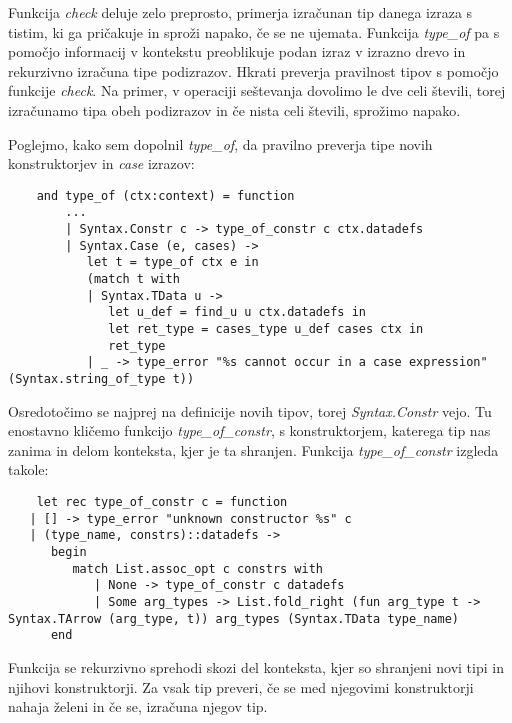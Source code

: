 \documentclass[12pt,a4paper,openany]{book}
\begin{document}
Funkcija \emph{check} deluje zelo preprosto, primerja izračunan tip danega izraza s tistim, ki ga pričakuje in sproži napako, če se ne ujemata. Funkcija \emph{type\_of} pa s pomočjo informacij 
v kontekstu preoblikuje podan izraz v izrazno drevo in rekurzivno izračuna tipe podizrazov. Hkrati preverja pravilnost tipov s pomočjo funkcije \emph{check}. Na primer, v operaciji seštevanja 
dovolimo le dve celi števili, torej izračunamo tipa obeh podizrazov in če nista celi števili, sprožimo napako.

Poglejmo, kako sem dopolnil \emph{type\_of}, da pravilno preverja tipe novih konstruktorjev in \emph{case} izrazov:
\begin{lstlisting}
	and type_of (ctx:context) = function
		...
		| Syntax.Constr c -> type_of_constr c ctx.datadefs
		| Syntax.Case (e, cases) -> 
		   let t = type_of ctx e in
		   (match t with
		   | Syntax.TData u -> 
			  let u_def = find_u u ctx.datadefs in
			  let ret_type = cases_type u_def cases ctx in
			  ret_type
		   | _ -> type_error "%s cannot occur in a case expression" (Syntax.string_of_type t))
\end{lstlisting}
Osredotočimo se najprej na definicije novih tipov, torej \emph{Syntax.Constr} vejo. Tu enostavno kličemo funkcijo \emph{type\_of\_constr}, s konstruktorjem, katerega tip nas zanima in delom 
konteksta, kjer je ta shranjen. Funkcija \emph{type\_of\_constr} izgleda takole:
\begin{lstlisting}
	let rec type_of_constr c = function
   | [] -> type_error "unknown constructor %s" c
   | (type_name, constrs)::datadefs -> 
      begin
         match List.assoc_opt c constrs with
            | None -> type_of_constr c datadefs
            | Some arg_types -> List.fold_right (fun arg_type t -> Syntax.TArrow (arg_type, t)) arg_types (Syntax.TData type_name) 
      end
\end{lstlisting}
Funkcija se rekurzivno sprehodi skozi del konteksta, kjer so shranjeni novi tipi in njihovi konstruktorji. Za vsak tip preveri, če se med njegovimi konstruktorji nahaja želeni in če se, izračuna 
njegov tip. 
\end{document}

